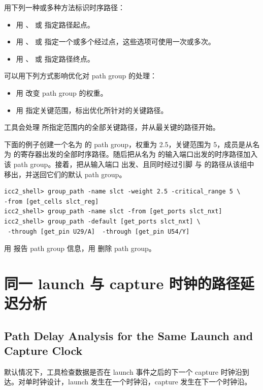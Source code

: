用下列一种或多种方法标识时序路径：
\begin{itemize}
  \item 用 、 或  指定路径起点。
  \item 用 、 或  指定一个或多个经过点，这些选项可使用一次或多次。
  \item 用 、 或  指定路径终点。
\end{itemize}

可以用下列方式影响优化对 path group 的处理：
\begin{itemize}
  \item 用  改变 path group 的权重。
  \item 用  指定关键范围，标出优化所针对的关键路径。
\end{itemize}

工具会处理  所指定范围内的全部关键路径，并从最关键的路径开始。

下面的例子创建一个名为  的 path group，权重为 2.5，关键范围为 5，成员是从名为  的寄存器出发的全部时序路径。随后把从名为  的输入端口出发的时序路径加入该 path group。接着，把从输入端口  出发、且同时经过引脚  与  的路径从该组中移出，并送回它们的默认 path group。

\begin{lstlisting}
icc2_shell> group_path -name slct -weight 2.5 -critical_range 5 \
-from [get_cells slct_reg]
icc2_shell> group_path -name slct -from [get_ports slct_nxt]
icc2_shell> group_path -default [get_ports slct_nxt] \
 -through [get_pin U29/A]  -through [get_pin U54/Y]
\end{lstlisting}

用  报告 path group 信息，用  删除 path group。

\section{同一 launch 与 capture 时钟的路径延迟分析}
\subsection*{Path Delay Analysis for the Same Launch and Capture Clock}

默认情况下，工具检查数据是否在 launch 事件之后的下一个 capture 时钟沿到达。对单时钟设计，launch 发生在一个时钟沿，capture 发生在下一个时钟沿。

